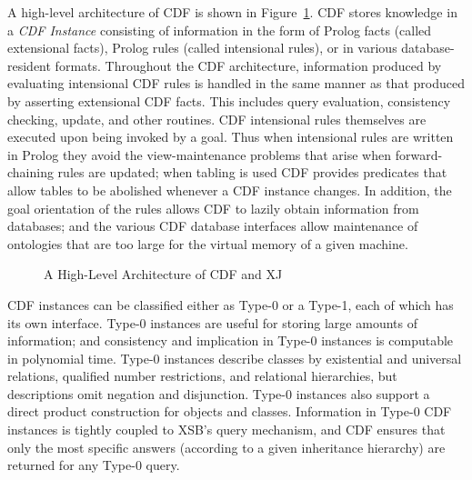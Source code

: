 A high-level architecture of CDF is shown in Figure~\ref{fig:arch}.
CDF stores knowledge in a {\em CDF Instance} consisting of information
in the form of Prolog facts (called extensional facts), Prolog rules
(called intensional rules), or in various database-resident formats.
Throughout the CDF architecture, information produced by evaluating
intensional CDF rules is handled in the same manner as that produced
by asserting extensional CDF facts.  This includes query evaluation,
consistency checking, update, and other routines.  CDF intensional
rules themselves are executed upon being invoked by a goal.  Thus when
intensional rules are written in Prolog they avoid the
view-maintenance problems that arise when forward-chaining rules are
updated; when tabling is used CDF provides predicates that allow
tables to be abolished whenever a CDF instance changes.  In addition,
the goal orientation of the rules allows CDF to lazily obtain
information from databases; and the various CDF database interfaces
allow maintenance of ontologies that are too large for the virtual
memory of a given machine.

\begin{figure}[htbp] 
\caption{A High-Level Architecture of CDF and XJ}
\label{fig:arch}
\end{figure}

CDF instances can be classified either as Type-0 or a Type-1, each of
which has its own interface.  Type-0 instances are useful for storing
large amounts of information; and consistency and implication in
Type-0 instances is computable in polynomial time.  Type-0 instances
describe classes by existential and universal relations, qualified
number restrictions, and relational hierarchies, but descriptions omit
negation and disjunction. Type-0 instances also support a direct
product construction for objects and classes.  
Information in Type-0 CDF instances is tightly coupled to XSB's
query mechanism, and CDF ensures that only the most specific answers
(according to a given inheritance hierarchy) are returned for any
Type-0 query.

